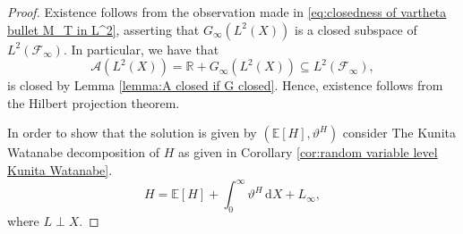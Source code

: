 \documentclass[11pt,a4paper,twoside,openany]{report}
\numberwithin{equation}{section}
\newcommand{\diff}{\mathrm{d}}
\theoremstyle{plain} %
\theoremstyle{definition} %
\theoremstyle{remark} %
\begin{document}
\begin{proof}
    Existence follows from  the observation made in \eqref{eq:closedness of vartheta bullet M_T in L^2}, asserting that \(G_{\infty}(L^2(X))\) is a closed subspace of \(L^2(\mathcal{F}_{\infty})\). In particular, we have that  
    \begin{equation*}
        \mathcal{A}(L^2(X))=\mathbb{R}+G_{\infty}(L^2(X))\subseteq L^2(\mathcal{F}_{\infty}),
    \end{equation*}
    is closed by Lemma \ref{lemma:A closed if G closed}. Hence, existence follows from the Hilbert projection theorem.

    In order to show that the solution is given by \((\mathbb{E}[H],\vartheta^H)\) consider The Kunita Watanabe decomposition of \(H\) as given in Corollary \ref{cor:random variable level Kunita Watanabe}. 
 \begin{equation}\label{eq:KW of liability H}
    H=\mathbb{E}[H]+\int_0^{\infty}\vartheta^H\,\diff X+L_{\infty} ,
 \end{equation}
 where \(L\perp X\). 



\end{proof}
\end{document}
